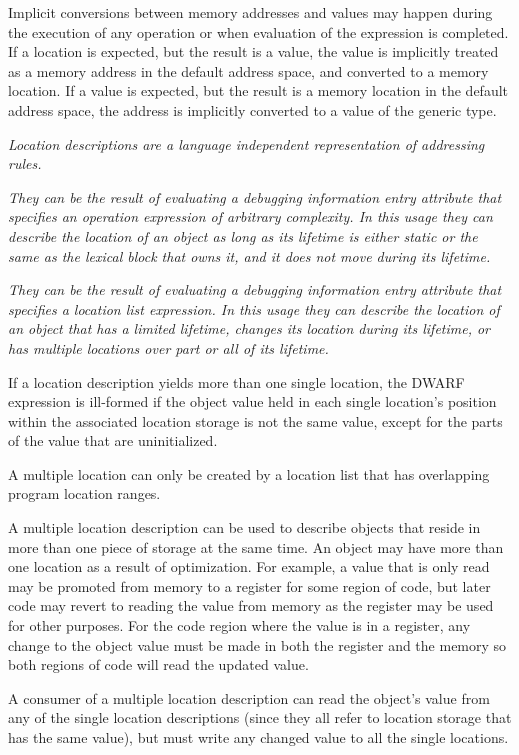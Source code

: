 Implicit conversions between memory addresses and values may happen
during the execution of any operation or when evaluation of the
expression is completed. If a location is expected, but the result is
a value, the value is implicitly treated as a memory address in the
default address space, and converted to a memory location. If a value
is expected, but the result is a memory location in the default
address space, the address is implicitly converted to a value of the
generic type.

\textit{Location descriptions are a language independent representation of
addressing rules.}

\textit{They can be the result of evaluating a debugging information entry
attribute that specifies an operation expression of arbitrary
complexity. In this usage they can describe the location of an object
as long as its lifetime is either static or the same as the lexical
block that owns it, and it does not move during its lifetime.}

\textit{They can be the result of evaluating a debugging information entry
attribute that specifies a location list expression. In this usage they
can describe the location of an object that has a limited lifetime,
changes its location during its lifetime, or has multiple locations over
part or all of its lifetime.}

If a location description yields more than one single location,
the DWARF expression is ill-formed if the object value held in each
single location’s position within the associated location
storage is not the same value, except for the parts of the value that
are uninitialized.

A multiple location can only be created by a location list that has
overlapping program location ranges.

A multiple location description can be used to describe objects that
reside in more than one piece of storage at the same time. An object
may have more than one location as a result of optimization. For
example, a value that is only read may be promoted from memory to a
register for some region of code, but later code may revert to reading
the value from memory as the register may be used for other purposes.
For the code region where the value is in a register, any change to
the object value must be made in both the register and the memory so
both regions of code will read the updated value.

A consumer of a multiple location description can read the object’s
value from any of the single location descriptions (since they all
refer to location storage that has the same value), but must write any
changed value to all the single locations.

